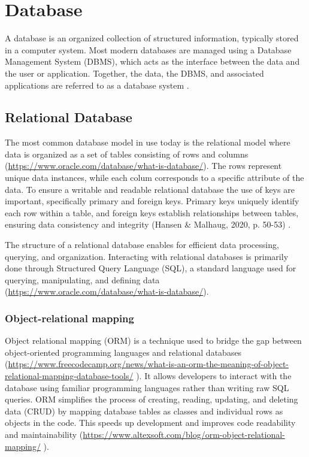 
\section{Database}

A database is an organized collection of structured information, typically stored in a computer system. Most modern databases are managed using a Database Management System (DBMS), which acts as the interface between the data and the user or application. Together, the data, the DBMS, and associated applications are referred to as a database system \autocite{OracleDB}.

\subsection{Relational Database}

The most common database model in use today is the relational model where data is organized as a set of tables consisting of rows and columns (\href{https://www.oracle.com/database/what-is-database/}{https://www.oracle.com/database/what-is-database/}). The rows represent unique data instances, while each colum corresponds to a specific attribute of the data. To ensure a writable and readable relational database the use of keys are important, specifically primary and foreign keys. Primary keys uniquely identify each row within a table, and foreign keys establish relationships between tables, ensuring data consistency and integrity (Hansen \& Malhaug, 2020, p. 50-53) .

The structure of a relational database enables for efficient data processing, querying, and organization. Interacting with relational databases is primarily done through Structured Query Language (SQL), a standard language used for querying, manipulating, and defining data (\href{https://www.oracle.com/database/what-is-database/}{https://www.oracle.com/database/what-is-database/}).

\subsubsection{Object-relational mapping}

Object relational mapping (ORM) is a technique used to bridge the gap between object-oriented programming languages and relational databases (\href{https://www.freecodecamp.org/news/what-is-an-orm-the-meaning-of-object-relational-mapping-database-tools/}{https://www.freecodecamp.org/news/what-is-an-orm-the-meaning-of-object-relational-mapping-database-tools/} ). It allows developers to interact with the database using familiar programming languages rather than writing raw SQL queries. ORM simplifies the process of creating, reading, updating, and deleting data (CRUD) by mapping database tables as classes and individual rows as objects in the code. This speeds up development and improves code readability and maintainability (\href{https://www.altexsoft.com/blog/orm-object-relational-mapping/}{https://www.altexsoft.com/blog/orm-object-relational-mapping/} ). 

